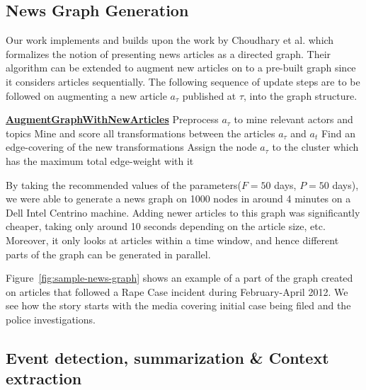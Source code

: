 \subsection{News Graph Generation}\label{sec:graph-desc}
Our work implements and builds upon the work by Choudhary et
al.\cite{choudhary@ecir2008} which formalizes the notion of presenting
news articles as a directed graph.  Their algorithm can be extended to
augment new articles on to a pre-built graph since it considers
articles sequentially.  The following sequence of update steps are to
be followed on augmenting a new article $a_\tau$ published at $\tau$, into
the graph structure.
\begin{algorithmic}
  \State \textbf{\underline{AugmentGraphWithNewArticles}}
  \State {}
  \State Preprocess $a_\tau$ to mine relevant actors and topics
    \State Mine and score all transformations between the articles $a_\tau$ and $a_t$
  \EndFor
  \State Find an edge-covering of the new transformations
  \State Assign the node $a_\tau$ to the cluster which has the maximum total edge-weight with it
\end{algorithmic}

By taking the recommended values of the parameters($F=50$ days, $P=50$ days), we were able to generate a news graph on 1000 nodes in around 4 minutes on a Dell Intel Centrino machine.
Adding newer articles to this graph was significantly cheaper, taking only around 10 seconds depending on the article size, etc.
Moreover, it only looks at articles within a time window, and hence different parts of the graph can be generated in parallel.

Figure~\ref{fig:sample-news-graph}  shows an example of a part of the graph created on articles that followed a Rape Case incident during February-April 2012. We see how the
story starts with the media covering initial case being filed and the police investigations.

\subsection{Event detection, summarization \& Context extraction}\label{sec:event-detection-summary-context}

